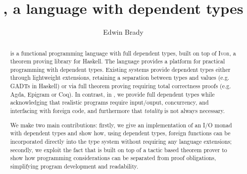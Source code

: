 \documentclass{llncs}
\newcommand{\Ivor}{\textsc{Ivor}}
\begin{document}
\title{\Idris{}, a language with dependent types}
\author{Edwin Brady}

 
\maketitle

\begin{abstract}
\Idris{} is a functional programming language with full dependent
types, built on top of \Ivor{}, a theorem proving library for
Haskell. The language provides a platform for practical programming
with dependent types. Existing systems provide dependent types
either through lightweight extensions, retaining a separation between
types and values (e.g. GADTs in Haskell) or via
full theorem proving requiring total correctness proofs (e.g. Agda,
Epigram or Coq). In contrast, in \Idris{}, we provide full dependent
types while acknowledging that realistic programs require input/ouput,
concurrency, and interfacing with foreign code, and furthermore that
\emph{totality} is not always necessary.

We make two main contributions: firstly, we give an implementation of
an I/O monad with dependent types and show how, using dependent types,
foreign functions can be incorporated directly into the type system
without requiring any language extensions; secondly, we exploit the
fact that \Idris{} is built on top of a tactic based theorem prover to
show how programming considerations can be separated from proof
obligations, simplifying program development and readability.


\end{abstract}





%

%

%



\newcommand{\Pair}{\TC{Pair}}
\newcommand{\MkPair}{\DC{MkPair}}






%

\end{document}
